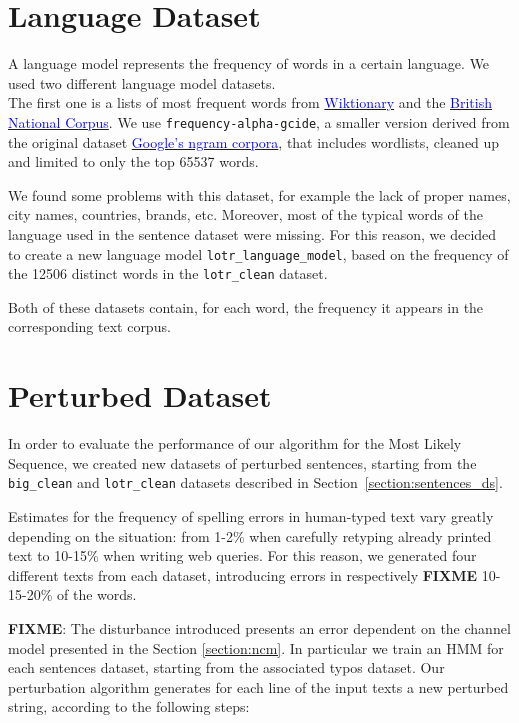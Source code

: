 \section{Language Dataset}
A language model represents the frequency of words in a certain language.
We used two different language model datasets. \\
The first one is a lists of most frequent words from 
\href{https://en.wiktionary.org/wiki/Wiktionary:Frequency_lists}{\textcolor{blue}{Wiktionary}} and the 
	\href{http://www.kilgarriff.co.uk/bnc-readme.html}{\textcolor{blue}{British National Corpus}}. 
We use \texttt{frequency-alpha-gcide}, a smaller version derived from the original dataset 
\href{https://books.google.com/ngrams/}{\textcolor{blue}{Google's ngram corpora}}, that includes wordlists, 
cleaned up and limited to only the top \num{65537} words.

We found some problems with this dataset, for example the lack of proper names, city names, countries, brands, 
etc. Moreover, most of the typical words of the language used in the sentence dataset were missing.
For this reason, we decided to create a new language model \texttt{lotr\_language\_model}, based on the 
frequency of the \num{12506} distinct words in the \texttt{lotr\_clean} dataset.

Both of these datasets contain, for each word, the frequency it appears in the corresponding text corpus.

\section{Perturbed Dataset}
\label{section:perturbed}
In order to evaluate the performance of our algorithm for the Most Likely Sequence, we created new datasets of 
perturbed sentences, starting from the \texttt{big\_clean} and \texttt{lotr\_clean} datasets described in 
Section~\ref{section:sentences_ds}.

Estimates for the frequency of spelling errors in human-typed text vary greatly depending on the situation: from 1-2\% 
when carefully retyping already printed text to 10-15\% when writing web queries. For this reason, we generated four 
different texts from each dataset, introducing errors in respectively \textbf{FIXME} \num{10}-\num{15}-\num{20}\% of 
the words.

\textbf{FIXME}:
The disturbance introduced presents an error dependent on the channel model presented in the Section 
\ref{section:ncm}. In particular we train an HMM for each sentences dataset, starting from the associated typos 
dataset.
Our perturbation algorithm generates for each line of the input texts a new perturbed string, according to the 
following steps:

